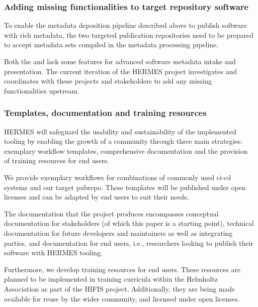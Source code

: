 \documentclass[11pt,a4paper]{scrartcl}
\begin{document}
\subsubsection{Adding missing functionalities to target repository software}\label{subsubsec:concept-implementation-targets}
To enable the metadata deposition pipeline described above to publish software with rich metadata, the two targeted publication
repositories need to be prepared to accept metadata sets compiled in the metadata processing pipeline.

Both the  and  lack some features for advanced
software metadata intake and presentation. The current iteration of the HERMES project investigates and coordinates with these
projects and stakeholders to add any missing functionalities upstream.

\subsubsection{Templates, documentation and training resources}\label{subsubsec:templates-documentation-training}

HERMES will safeguard the usability and sustainability of the implemented tooling by enabling the growth of a community through three main strategies: exemplary workflow templates, comprehensive documentation and the provision of training resources for end users.

We provide exemplary workflows for combinations of commonly used \gls{ci-cd} systems and our target \gls{pubrepo}. 
These templates will be published under open licenses and can be adapted by end users to suit their needs.

The documentation that the project produces encompasses conceptual documentation for stakeholders (of which this paper
is a starting point), technical documentation for future developers and maintainers as well as integrating parties,
and documentation for end users, i.e., researchers looking to publish their software with HERMES tooling.

Furthermore, we develop training resources for end users.
These resources are planned to be implemented in training curricula within the Helmholtz Association as part of the HIFIS project.
Additionally, they are being made available for reuse by the wider community, and licensed under open licenses.

\clearpage


\appendix
{}\label{tables-figures}
\end{document}
